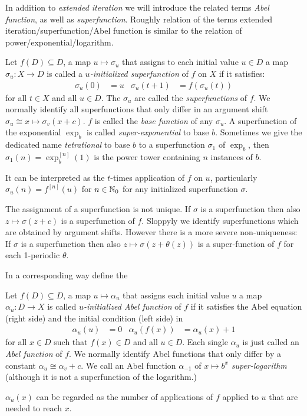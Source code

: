 \documentclass{article}
\numberwithin{equation}{section}
\begin{document}
In addition to {\em extended iteration} we will introduce the related terms {\em
  Abel function}, as well as {\em superfunction}. Roughly relation of the terms
extended iteration/superfunction/Abel function is similar to the
relation of power/exponential/logarithm.

\begin{definition}
  Let $f(D)\subseteq D$, a map $u\mapsto \sigma_u$ that assigns
  to each initial value $u\in D$ a map $\sigma_u\colon X\to D$ is called a
  {\em $u$-initialized superfunction} of $f$ on $X$ if it satisfies: 
  \begin{align}
    \sigma_u(0)&=u & \sigma_u(t+1)&=f(\sigma_u(t))
  \end{align}
  for all $t\in X$ and all $u\in D$. The $\sigma_u$ are called the
  {\em superfunctions} of $f$. We normally identify all superfunctions
  that only differ in an argument shift $\sigma_u \cong
  x\mapsto\sigma_v(x+c)$. $f$ is called the {\em base function} of any
  $\sigma_u$. A superfunction of the exponential $\exp_b$ is called
  {\em super-exponential} to base $b$. Sometimes we give the dedicated name
  {\em tetrational} to base $b$ to a superfunction $\sigma_1$ of
  $\exp_b$, then $\sigma_1(n)=\exp_b^{[n]}(1)$ is the power tower
  containing $n$ instances of $b$.
\end{definition}
It can be interpreted as the $t$-times application of $f$ on $u$,
particularly $\sigma_u(n)=f^{[n]}(u)$ for $n\in \mathbb{N}_0$ for any initialized superfunction $\sigma$.

The assignment of a superfunction is not unique. If $\sigma$ is a
superfunction then also $z\mapsto\sigma(z+c)$ is a superfunction of
$f$. Sloppyly we identify superfunctions which are obtained by
argument shifts. However there is a more severe non-uniqueness: If
$\sigma$ is a superfunction then also $z\mapsto \sigma(z+\theta(z))$
is a super-function of $f$ for each 1-periodic $\theta$. 


In a corresponding way define the
\begin{definition}
  Let $f(D)\subseteq D$, a map $u\mapsto \alpha_{u}$ that assigns
  each initial value $u$ a map $\alpha_{u}\colon D\to X$ is
  called {\em $u$-initialized Abel function} of $f$ if it satisfies the
  Abel equation (right side) and the initial condition (left side) in
  \begin{align}\label{eq:abel_equation}
    \alpha_{u}(u) &= 0& \alpha_{u}(f(x))&=\alpha_{u}(x)+1
  \end{align}
  for all $x\in D$ such that $f(x)\in D$ and all $u\in D$. 
  Each single $\alpha_u$ is just called an {\em Abel function} of
  $f$. 
  We normally identify Abel functions that only differ by a
  constant $\alpha_u \cong \alpha_v+c$. We call 
  an Abel function $\alpha_{-1}$ of $x\mapsto b^x$ {\em super-logarithm} (although
  it is not a superfunction of the logarithm.)
\end{definition}
$\alpha_u(x)$ can be regarded as the number of applications of $f$ applied
to $u$ that are needed to reach $x$.
\end{document}
